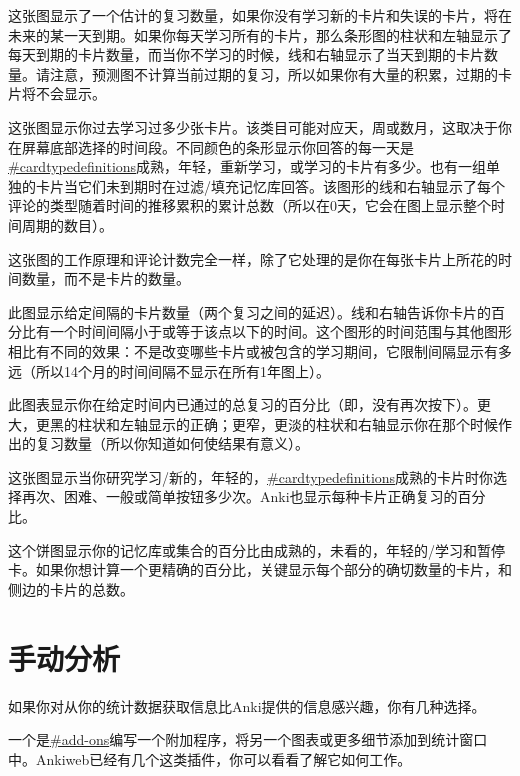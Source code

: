 \documentclass[a4paper]{book}
\begin{document}
		\begin{description}
			\itemsep1pt\parskip0pt
			\item[预测] 这张图显示了一个估计的复习数量，如果你没有学习新的卡片和失误的卡片，将在未来的某一天到期。如果你每天学习所有的卡片，那么条形图的柱状和左轴显示了每天到期的卡片数量，而当你不学习的时候，线和右轴显示了当天到期的卡片数量。请注意，预测图不计算当前过期的复习，所以如果你有大量的积累，过期的卡片将不会显示。
			\item[评论计数] 这张图显示你过去学习过多少张卡片。该类目可能对应天，周或数月，这取决于你在屏幕底部选择的时间段。不同颜色的条形显示你回答的每一天是\url{#cardtypedefinitions}成熟，年轻，重新学习，或学习的卡片有多少。也有一组单独的卡片当它们未到期时在过滤/填充记忆库回答。该图形的线和右轴显示了每个评论的类型随着时间的推移累积的累计总数（所以在0天，它会在图上显示整个时间周期的数目）。
			\item[复习时间] 这张图的工作原理和评论计数完全一样，除了它处理的是你在每张卡片上所花的时间数量，而不是卡片的数量。
			\item[间隔] 此图显示给定间隔的卡片数量（两个复习之间的延迟）。线和右轴告诉你卡片的百分比有一个时间间隔小于或等于该点以下的时间。这个图形的时间范围与其他图形相比有不同的效果：不是改变哪些卡片或被包含的学习期间，它限制间隔显示有多远（所以14个月的时间间隔不显示在所有1年图上）。
			\item[每小时的分析] 此图表显示你在给定时间内已通过的总复习的百分比（即，没有再次按下）。更大，更黑的柱状和左轴显示的正确；更窄，更淡的柱状和右轴显示你在那个时候作出的复习数量（所以你知道如何使结果有意义）。
			\item[回答按钮] 这张图显示当你研究学习/新的，年轻的，\url{#cardtypedefinitions}成熟的卡片时你选择再次、困难、一般或简单按钮多少次。Anki也显示每种卡片正确复习的百分比。
			\item[卡片类型] 这个饼图显示你的记忆库或集合的百分比由成熟的，未看的，年轻的/学习和暂停卡。如果你想计算一个更精确的百分比，关键显示每个部分的确切数量的卡片，和侧边的卡片的总数。               
		\end{description}
		
		\section{手动分析}
		
		如果你对从你的统计数据获取信息比Anki提供的信息感兴趣，你有几种选择。
		
		一个是\url{#add-ons}编写一个附加程序，将另一个图表或更多细节添加到统计窗口中。Ankiweb已经有几个这类插件，你可以看看了解它如何工作。
		
\end{document}
